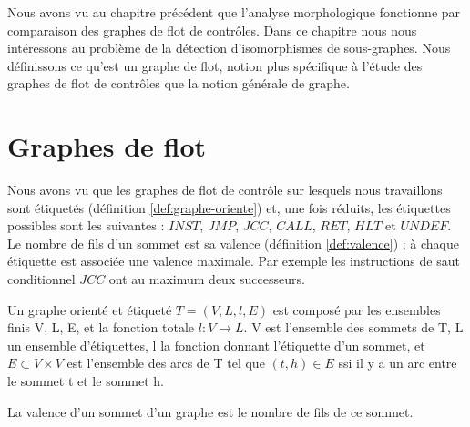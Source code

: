 


Nous avons vu au chapitre précédent que l'analyse morphologique fonctionne par comparaison des graphes de flot de contrôles.
Dans ce chapitre nous nous intéressons au problème de la détection d'isomorphismes de sous-graphes. Nous définissons ce qu'est un graphe de flot, notion plus spécifique à l'étude des graphes de flot de contrôles que la notion générale de graphe.

\section{Graphes de flot}
Nous avons vu que les graphes de flot de contrôle sur lesquels nous travaillons sont étiquetés (définition \ref{def:graphe-oriente}) et, une fois réduits, les étiquettes possibles sont les suivantes : $INST$, $JMP$, $JCC$, $CALL$, $RET$, $HLT$ et $UNDEF$.
Le nombre de fils d'un sommet est sa valence (définition \ref{def:valence}) ; à chaque étiquette est associée une valence maximale. Par exemple les instructions de saut conditionnel $JCC$ ont au maximum deux successeurs.

\begin{defi}
Un graphe orienté et étiqueté $T=(V, L, l, E)$ est composé par les ensembles finis V, L, E, et la fonction totale $l:V\rightarrow L$.
V est l'ensemble des sommets de T, L un ensemble d'étiquettes, l la fonction donnant l'étiquette d'un sommet, et $E\subset V\times V$ est l'ensemble des arcs de T tel que $(t, h)\in E$ ssi il y a un arc entre le sommet t et le sommet h.
\label{def:graphe-oriente}
\end{defi}

\begin{defi}\label{def:valence}
 La valence d'un sommet d'un graphe est le nombre de fils de ce sommet.
\end{defi}


